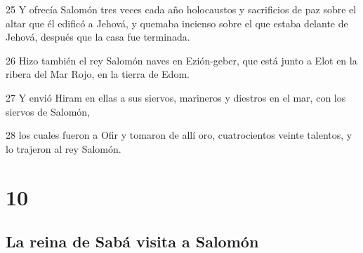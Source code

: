 \par 25 Y ofrecía Salomón tres veces cada año holocaustos y sacrificios de paz sobre el altar que él edificó a Jehová, y quemaba incienso sobre el que estaba delante de Jehová, después que la casa fue terminada.
\par 26 Hizo también el rey Salomón naves en Ezión-geber, que está junto a Elot en la ribera del Mar Rojo, en la tierra de Edom.
\par 27 Y envió Hiram en ellas a sus siervos, marineros y diestros en el mar, con los siervos de Salomón,
\par 28 los cuales fueron a Ofir y tomaron de allí oro, cuatrocientos veinte talentos,  y lo trajeron al rey Salomón.

\chapter{10}

\section*{La reina de Sabá visita a Salomón}

